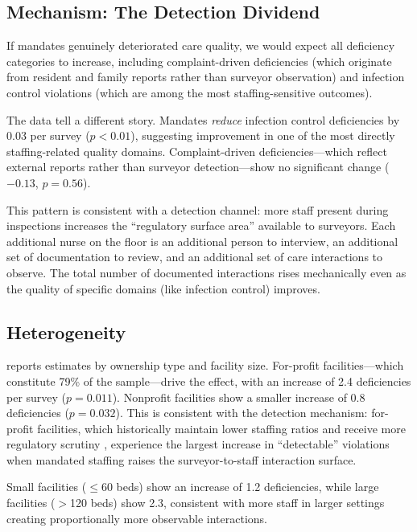 \documentclass[12pt]{article}
\begin{document}
\subsection{Mechanism: The Detection Dividend}

If mandates genuinely deteriorated care quality, we would expect all deficiency categories to increase, including complaint-driven deficiencies (which originate from resident and family reports rather than surveyor observation) and infection control violations (which are among the most staffing-sensitive outcomes).

The data tell a different story. Mandates \textit{reduce} infection control deficiencies by 0.03 per survey ($p < 0.01$), suggesting improvement in one of the most directly staffing-related quality domains. Complaint-driven deficiencies---which reflect external reports rather than surveyor detection---show no significant change ($-0.13$, $p = 0.56$).

This pattern is consistent with a detection channel: more staff present during inspections increases the ``regulatory surface area'' available to surveyors. Each additional nurse on the floor is an additional person to interview, an additional set of documentation to review, and an additional set of care interactions to observe. The total number of documented interactions rises mechanically even as the quality of specific domains (like infection control) improves.

\subsection{Heterogeneity}



 reports estimates by ownership type and facility size. For-profit facilities---which constitute 79\% of the sample---drive the effect, with an increase of 2.4 deficiencies per survey ($p = 0.011$). Nonprofit facilities show a smaller increase of 0.8 deficiencies ($p = 0.032$). This is consistent with the detection mechanism: for-profit facilities, which historically maintain lower staffing ratios and receive more regulatory scrutiny \citep{harrington2012}, experience the largest increase in ``detectable'' violations when mandated staffing raises the surveyor-to-staff interaction surface.

Small facilities ($\leq$60 beds) show an increase of 1.2 deficiencies, while large facilities ($>$120 beds) show 2.3, consistent with more staff in larger settings creating proportionally more observable interactions.
\end{document}
